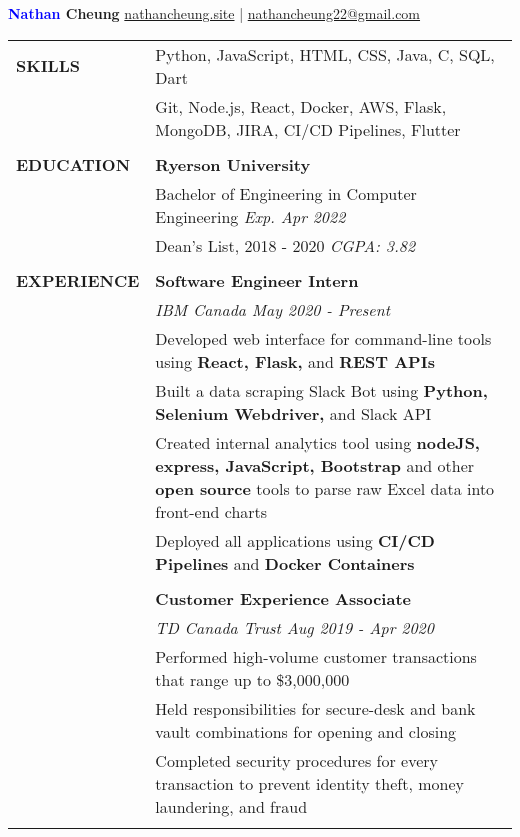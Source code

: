 \documentclass[letterpaper,11pt,oneside]{article}
\makeatletter
\newcommand\tabitem{\makebox[1em][r]{-~~}} %
\newcommand\tabspace{\makebox[1em][r]{~~~}} %
\newcommand{\header}{\noindent \huge{\textbf{\textcolor{blue}{Nathan} Cheung}} \hfill \normalsize{\href{https://nathancheung.site}{nathancheung.site} | \href{mailto:nathancheung22@gmail.com}{nathancheung22@gmail.com}} \\
\vspace{-2ex}
\hline 
\normalsize
\vspace{1.25em}}
\makeatother
\begin{document}
\header %


\noindent \begin{tabular}{@{}p{1.15in} p{6.08in}@{}}
 \textbf{SKILLS} 
     & \tabitem Python, JavaScript, HTML, CSS, Java, C, SQL, Dart \\
     & \tabitem Git, Node.js, React, Docker, AWS, Flask, MongoDB, JIRA, CI/CD Pipelines, Flutter \\
     & \\

 \textbf{EDUCATION}
     & \textbf{Ryerson University} \\
     & Bachelor of Engineering in Computer Engineering \hfill \textit{Exp. Apr 2022} \\
     & Dean's List, 2018 - 2020 \hfill \textit{CGPA: 3.82} \\
     & \\

 \textbf{EXPERIENCE} 
     & \textbf{Software Engineer Intern} \\
     & \textit{IBM Canada \hfill May 2020 - Present} \\
     & \tabitem Developed web interface for command-line tools using \textbf{React, Flask,} and \textbf{REST APIs} \\
     & \tabitem Built a data scraping Slack Bot using \textbf{Python, Selenium Webdriver,} and Slack API \\
     & \tabitem Created internal analytics tool using \textbf{nodeJS, express, JavaScript, Bootstrap} and other \tabspace \textbf{open source} tools to parse raw Excel data into front-end charts \\
     & \tabitem Deployed all applications using \textbf{CI/CD Pipelines} and \textbf{Docker Containers} \\
     & \\
 
     & \textbf{Customer Experience Associate} \\
     & \textit{TD Canada Trust \hfill Aug 2019 - Apr 2020} \\
     & \tabitem Performed high-volume customer transactions that range up to \$3,000,000 \\ 
     & \tabitem Held responsibilities for secure-desk and bank vault combinations for opening and closing \\
     & \tabitem Completed security procedures for every transaction to prevent identity theft, money \tabspace laundering, and fraud \\
     & \\
     

\end{tabular}
\end{document}
